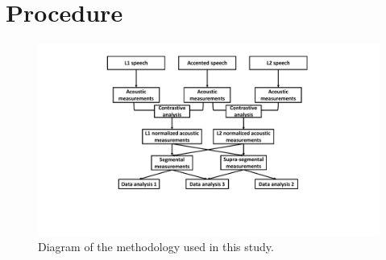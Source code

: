 \section{Procedure}

 \begin{figure}[t]
\centering
\captionsetup{justification=centering}
\includegraphics[width = 0.8\linewidth]{figures/method_diagram.pdf}
\caption{Diagram of the methodology used in this study.}
\label{fig:method_diagram}
\end{figure}

